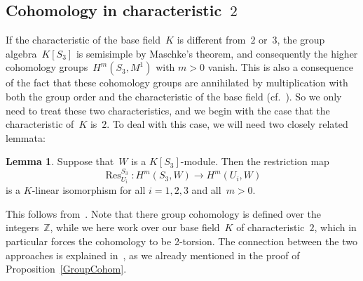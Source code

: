 \documentclass[12pt]{article}
\makeatletter
\theoremstyle{definition}
\newtheorem{Lemma}[Satz]{Lemma}
\theoremstyle{break}
\renewenvironment{proof}[1][\proofname]{\par
\vspace{-5pt}%
\pushQED{\qed}%
\normalfont
\topsep0pt \partopsep0pt %
\trivlist
\item[\hskip\labelsep
\bfseries
#1\@addpunct{.}]\ignorespaces
}{%
\popQED\endtrivlist\@endpefalse
\addvspace{6pt plus 6pt} %
}
\newcommand{\Z}{\mathbb{Z}}
\DeclareMathOperator\Res{Res}
\renewcommand{\1}{\mathbbm{1}}
\makeatother
\begin{document}
\subsection{Cohomology in characteristic~$2$} \label{Char2}
If the characteristic of the base field~$K$ is different from~$2$ or~$3$, the group algebra~$K[S_3]$ is semisimple by Maschke's theorem, and consequently the higher cohomology groups~$H^m(S_3, M^1)$ with $m>0$ vanish. This is also a consequence of the fact that these cohomology groups are annihilated by multiplication with both the group order and the characteristic of the base field (cf.~\cite[Chap.~2, \S~7, Cor.~2, p.~210]{Su}). So we only need to treat these two characteristics, and we begin with the case that the characteristic of~$K$ is~$2$. To deal with this case, we will need two closely related lemmata:
\begin{Lemma} \label{ResChar2}
Suppose that~$W$ is a $K[S_3]$-module. Then the restriction map
\[\Res^{S_3}_{U_i} \colon H^m(S_3, W) \to H^m(U_i, W)\]
is a $K$-linear isomorphism for all $i=1,2,3$ and all~$m > 0$.
\end{Lemma}
\begin{proof}
This follows from~\cite[Chap.~2, \S~7, (7.28), p.~211]{Su}. Note that there group cohomology is defined over the integers~$\Z$, while we here work over our base field~$K$ of characteristic~$2$, which in particular forces the cohomology to be 2-torsion. The connection between the two approaches is explained in~\cite[Sec.~1.1, p.~3]{E}, as we already mentioned in the proof of Proposition~\ref{GroupCohom}.
\end{proof}
\end{document}
